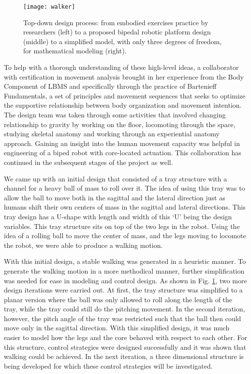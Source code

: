 \documentclass[arts,article,submit,moreauthors,pdftex,10pt,a4paper]{mdpi}
\begin{document}
\begin{figure}[h!]
\centering
\vspace{-.1in}
\texttt{[image: walker]}
\caption{Top-down design process: from embodied exercises practice by researchers (left) to a proposed bipedal robotic platform design (middle) to a simplified model, with only three degrees of freedom, for mathematical modeling (right). \cite{umer2016lbms,umer2016control}}
\label{walker}
\end{figure}

To help with a thorough understanding of these high-level ideas, a collaborator with certification in movement analysis brought in her experience from the Body Component of LBMS and specifically through the practice of Bartenieff Fundamentals, a set of principles and movement sequences that seeks to optimize the supportive relationship between body organization and movement intention. 
The design team was taken through some activities that involved changing relationship to gravity by working on the floor, locomoting through the space, studying skeletal anatomy and working through an experiential anatomy approach. Gaining an insight into the human movement capacity was helpful in engineering of a biped robot with core-located actuation. This collaboration has continued in the subsequent stages of the project as well.


We came up with an initial design that consisted of a tray structure with a channel for a heavy ball of mass to roll over it. The idea of using this tray was to allow the ball to move both in the sagittal and the lateral direction just as humans shift their own centers of mass in the sagittal and lateral directions. This tray design has a U-shape with length and width of this ‘U’ being the design variables. This tray structure sits on top of the two legs in the robot. Using the idea of a rolling ball to move the center of mass, and the legs moving to locomote the robot, we were able to produce a walking motion. \cite{umer2016lbms}


With this initial design, a stable walking was generated in a heuristic manner. To generate the walking motion in a more methodical manner, further simplification was needed for ease in modeling and control design. As shown in Fig. \ref{walker}, two more design iterations were carried out. At first, the tray structure was simplified to a planar version where the ball was only allowed to roll along the length of the tray, while the tray could still do the pitching movement. In the second iteration, however, the pitch angle of the tray was restricted such that the ball then could move only in the sagittal direction. With this simplified design, it was much easier to model how the legs and the core behaved with respect to each other. For this structure, control strategies were designed successfully and it was shown that walking could be achieved.  \cite{umer2016control} In the next iteration, a three dimensional structure is being developed for which these control strategies will be investigated.
\end{document}
